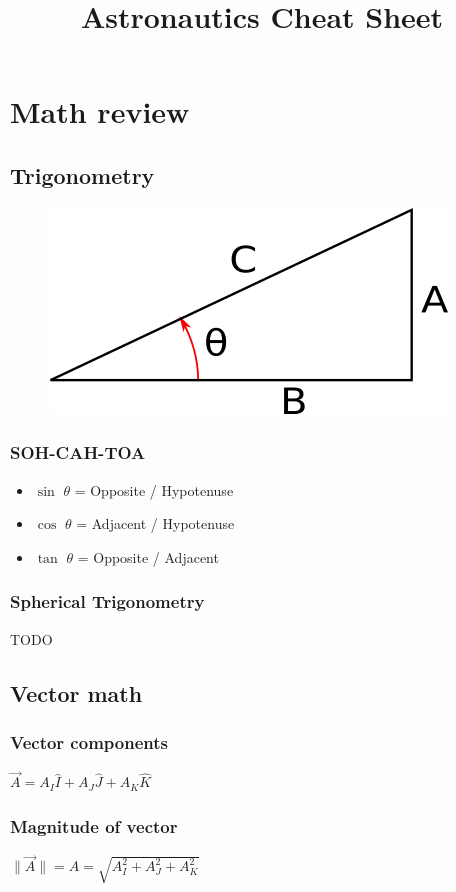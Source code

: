 \documentclass{article}
\title{Astronautics Cheat Sheet}
\begin{document}
\maketitle

\section{Math review}
\subsection{Trigonometry}
	\begin{figure}[H]
		\centering
		\includegraphics[width=0.4\linewidth]{img/trigo_triangle}
		\label{fig:trigo_triangle}
	\end{figure}

\subsubsection*{SOH-CAH-TOA}

\begin{itemize}
	\item $\sin$ $\theta$ = Opposite / Hypotenuse
	\item $\cos$ $\theta$ = Adjacent / Hypotenuse
	\item $\tan$ $\theta$ = Opposite / Adjacent
\end{itemize}

\subsubsection*{Spherical Trigonometry}
TODO

\subsection{Vector math}
\subsubsection*{Vector components}
$\vec{A} = A_I\hat{I} + A_J\hat{J} + A_K\hat{K}$

\subsubsection*{Magnitude of vector}
$\lVert\vec{A}\rVert = A = \sqrt{A_I^2 + A_J^2 + A_K^2}$
\end{document}
